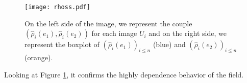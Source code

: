 \documentclass[12pt]{article}
\renewcommand{\hat}{\widehat}
\theoremstyle{Theorem}
\theoremstyle{definition}
\begin{document}
\begin{figure}[H]
  \centering
    {\texttt{[image: rhoss.pdf]}}
    \hspace{0.2cm}
 \caption{On the left side of the image, we represent the couple $\left(\hat{\rho}_{i}(e_1), \hat{\rho}_{i}(e_2)\right)$ for each image $U_{i}$ and on the right side, we represent the boxplot of $(\hat{\rho}_{i}(e_1))_{i \leq n}$ (blue) and $(\hat{\rho}_{i}(e_2))_{i \leq n}$ (orange).}
\label{boxplotrho}
\end{figure}
Looking at Figure \ref{boxplotrho}, it confirms the highly dependence behavior of the field.
\appendix 
\end{document}
